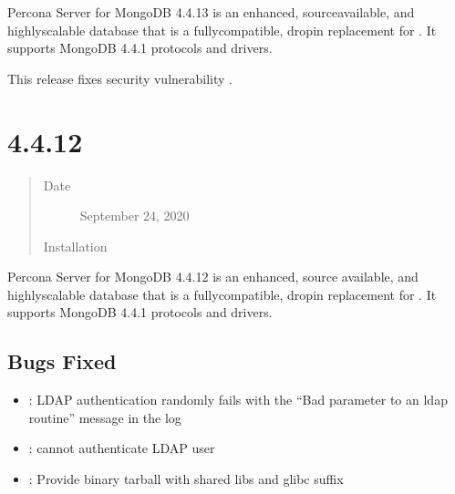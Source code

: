 \documentclass[letterpaper,10pt,english]{sphinxmanual}
\begin{document}
\sphinxAtStartPar
Percona Server for MongoDB 4.4.1\sphinxhyphen{}3 is an enhanced, source\sphinxhyphen{}available, and highly\sphinxhyphen{}scalable database that is a
fully\sphinxhyphen{}compatible, drop\sphinxhyphen{}in replacement for .
It supports MongoDB 4.4.1 protocols and drivers.

\sphinxAtStartPar
This release fixes security vulnerability .


\section{ 4.4.1\sphinxhyphen{}2}
\label{\detokenize{release_notes/4.4.1-2:percona-server-for-mongodb-4-4-1-2}}\label{\detokenize{release_notes/4.4.1-2:psmdb-4-4-1-2}}\label{\detokenize{release_notes/4.4.1-2::doc}}\begin{quote}\begin{description}
\item[{Date}] \leavevmode
\sphinxAtStartPar
September 24, 2020

\item[{Installation}] \leavevmode
\sphinxAtStartPar
{}

\end{description}\end{quote}

\sphinxAtStartPar
Percona Server for MongoDB 4.4.1\sphinxhyphen{}2 is an enhanced, source available, and highly\sphinxhyphen{}scalable database that is a
fully\sphinxhyphen{}compatible, drop\sphinxhyphen{}in replacement for .
It supports MongoDB 4.4.1 protocols and drivers.


\subsection{Bugs Fixed}
\label{\detokenize{release_notes/4.4.1-2:bugs-fixed}}\begin{itemize}
\item {} 
\sphinxAtStartPar
{}: LDAP authentication randomly fails with the “Bad parameter to an ldap routine” message in the log

\item {} 
\sphinxAtStartPar
{}:  cannot authenticate LDAP user

\item {} 
\sphinxAtStartPar
{}: Provide binary tarball with shared libs and glibc suffix

\end{itemize}
\end{document}
